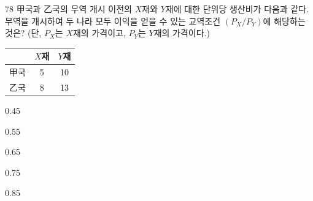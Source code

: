 \begin{question}{78}
甲국과 乙국의 무역 개시 이전의 $X$재와 $Y$재에 대한 단위당 생산비가 다음과 같다. 무역을 개시하여 두 나라 모두 이익을 얻을 수 있는 교역조건 $(P_{X}/P_{Y})$에 해당하는 것은? (단, $P_{X}$는 $X$재의 가격이고, $P_{Y}$는 $Y$재의 가격이다.)
\par{\small\centering\begin{tabular}{|c|c|c|}\hline
 & $X$재 & $Y$재 \\ \hline
甲국 & 5 & 10 \\ \hline
乙국 & 8 & 13 \\ \hline
\end{tabular}\par}
\begin{choices}
  \item 0.45
  \item 0.55
  \item 0.65
  \item 0.75
  \item 0.85
\end{choices}
\end{question}
